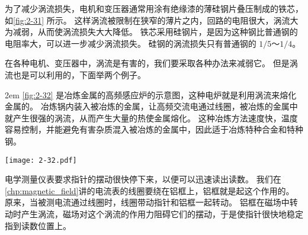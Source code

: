 为了减少涡流损失，电机和变压器通常用涂有绝缘漆的薄硅钢片叠压制成的铁芯，如\cref{fig:2-31} 所示。
这样涡流被限制在狭窄的薄片之内，回路的电阻很大，涡流大为减弱，从而使涡流损失大大降低。
铁芯采用硅钢片，是因为这种钢比普通钢的电阻率大，可以进一步减少涡流损失。
硅钢的涡流损失只有普通钢的 $1/5$～$1/4$。

在各种电机、变压器中，涡流是有害的，我们要采取各种办法来减弱它。
但是涡流也是可以利用的，下面举两个例子。

\medskip\noindent
\begin{minipage}{0.6\linewidth}\parindent2em
  \cref{fig:2-32} 是冶炼金属的高频感应炉的示意图，这种电炉就是利用涡流来熔化金属的。
  冶炼锅内装入被冶炼的金属，让高频交流电通过线圈，被冶炼的金属中就产生很强的涡流，从而产生大量的热使金属熔化。
  这种冶炼方法速度快，温度容易控制，并能避免有害杂质混入被冶炼的金属中，因此适于冶炼特种合金和特种钢。
\end{minipage}\hfill
\begin{minipage}{0.35\linewidth}\centering
  \begin{figurehere}
    \texttt{[image: 2-32.pdf]}
    \caption{}\label{fig:2-32}
  \end{figurehere}
\end{minipage}

\medskip
电学测量仪表要求指针的摆动很快停下来，以便可以迅速读出读数。
我们在\cref{chp:magnetic_field}讲的电流表的线圈要绕在铝框上，铝框就是起这个作用的。
原来，当被测电流通过线圈时，线圈带动指针和铝框一起转动。
铝框在磁场中转动时产生涡流，磁场对这个涡流的作用力阻碍它们的摆动，于是使指针很快地稳定指到读数位置上。

